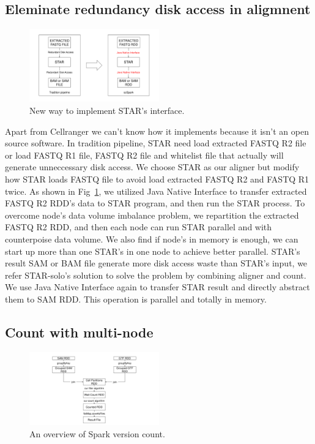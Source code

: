 \documentclass[conference]{IEEEtran}
\begin{document}
\subsection{Eleminate redundancy disk access in aligmnent}
\begin{figure}
  \includegraphics[width=0.5\textwidth]{fig2.pdf}
  \caption{New way to implement STAR's interface.} \label{fig2}
\end{figure}

Apart from Cellranger we can't know how it implements because it isn't an open source software. 
In tradition pipeline, STAR need load extracted FASTQ R2 file or load FASTQ R1 file, FASTQ R2 file and whitelist file that actually will generate unneccessary disk access. 
We choose STAR as our aligner but modify how STAR loads FASTQ file to avoid load extracted FASTQ R2 and FASTQ R1 twice. 
As shown in Fig~\ref{fig2}, we utilized Java Native Interface to transfer extracted FASTQ R2 RDD's data to STAR program, and then run the STAR process. 
To overcome node's data volume imbalance problem, we repartition the extracted FASTQ R2 RDD, and then each node can run STAR parallel and with counterpoise data volume. 
We also find if node's in memory is enough, we can start up more than one STAR's in one node to achieve better parallel. 
STAR's result SAM or BAM file generate more disk access waste than STAR's input, we refer STAR-solo's solution to solve the problem by combining aligner and count. 
We use Java Native Interface again to transfer STAR result and directly abstract them to SAM RDD. 
This operation is parallel and totally in memory. 

\subsection{Count with multi-node}

\begin{figure}
  \includegraphics[width=0.5\textwidth]{fig3.pdf}
  \caption{An overview of Spark version count.} \label{fig3}
\end{figure}
\end{document}
